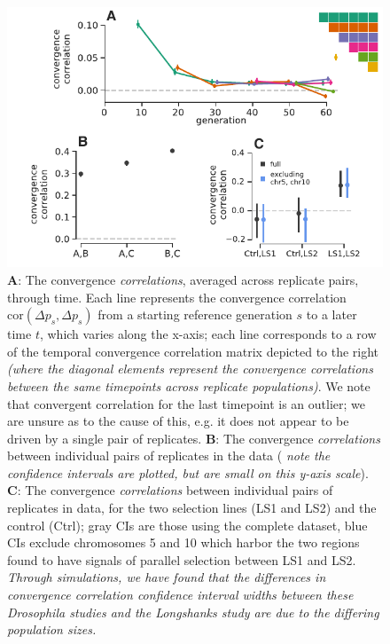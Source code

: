 \documentclass[11pt]{article}
\newcommand{\vb}[1]{{\it \color{blue} #1}}
\begin{document}
\begin{figure}[!htb]
  \centering
  \includegraphics[width=\textwidth]{figures/figure-2-revision.pdf}

  \caption{{\bf A}: The convergence \vb{correlations}, averaged across
    \textcite{Barghi2019-qy} replicate pairs, through time. Each line
    represents the convergence correlation $\mathrm{cor}(\Delta p_{s}, \Delta
    p_{s})$ from a starting reference generation $s$ to a later time $t$, which
    varies along the x-axis; each line corresponds to a row of the temporal
    convergence correlation matrix depicted to the right \vb{(where the
      diagonal elements represent the convergence correlations between the same
      timepoints across replicate populations)}. We note that convergent
      correlation for the last timepoint is an outlier; we are unsure as to the
      cause of this, e.g. it does not appear to be driven by a single pair of
      replicates. {\bf B}: The convergence \vb{correlations} between individual
      pairs of replicates in the \textcite{Kelly2019-dc} data (\vb{note the
      confidence intervals are plotted, but are small on this y-axis scale}).
      {\bf C}:  The convergence \vb{correlations} between individual pairs of
      replicates in \parencite{Castro2019-uk} data, for the two selection lines
      (LS1 and LS2) and the control (Ctrl); gray CIs are those using the
      complete dataset, blue CIs exclude chromosomes 5 and 10 which harbor the
      two regions \textcite{Castro2019-uk} found to have signals of parallel
      selection between LS1 and LS2. \vb{Through simulations, we have found
        that the differences in convergence correlation confidence interval
        widths between these \emph{Drosophila} studies and the Longshanks study
        are due to the differing population sizes.}}

  \label{fig:figure-2}
\end{figure}
\end{document}
